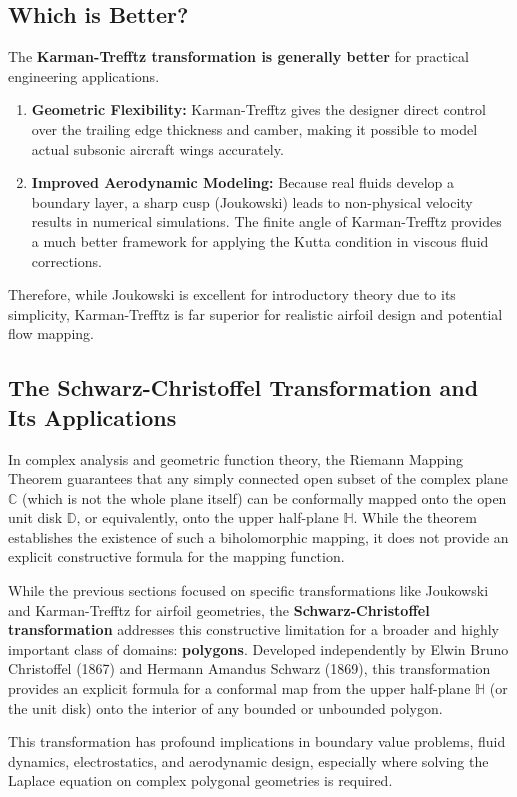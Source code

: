\documentclass[12pt,a4paper]{article}
\begin{document}
\subsection{Which is Better?}
The \textbf{Karman-Trefftz transformation is generally better} for practical engineering applications. 
\begin{enumerate}
    \item \textbf{Geometric Flexibility:} Karman-Trefftz gives the designer direct control over the trailing edge thickness and camber, making it possible to model actual subsonic aircraft wings accurately.
    \item \textbf{Improved Aerodynamic Modeling:} Because real fluids develop a boundary layer, a sharp cusp (Joukowski) leads to non-physical velocity results in numerical simulations. The finite angle of Karman-Trefftz provides a much better framework for applying the Kutta condition in viscous fluid corrections.
\end{enumerate}
Therefore, while Joukowski is excellent for introductory theory due to its simplicity, Karman-Trefftz is far superior for realistic airfoil design and potential flow mapping.
\subsection{The Schwarz-Christoffel Transformation and Its Applications}

In complex analysis and geometric function theory, the Riemann Mapping Theorem guarantees that any simply connected open subset of the complex plane $\mathbb{C}$ (which is not the whole plane itself) can be conformally mapped onto the open unit disk $\mathbb{D}$, or equivalently, onto the upper half-plane $\mathbb{H}$. While the theorem establishes the existence of such a biholomorphic mapping, it does not provide an explicit constructive formula for the mapping function.

While the previous sections focused on specific transformations like Joukowski and Karman-Trefftz for airfoil geometries, the \textbf{Schwarz-Christoffel transformation} addresses this constructive limitation for a broader and highly important class of domains: \textbf{polygons}. Developed independently by Elwin Bruno Christoffel (1867) and Hermann Amandus Schwarz (1869), this transformation provides an explicit formula for a conformal map from the upper half-plane $\mathbb{H}$ (or the unit disk) onto the interior of any bounded or unbounded polygon.

This transformation has profound implications in boundary value problems, fluid dynamics, electrostatics, and aerodynamic design, especially where solving the Laplace equation on complex polygonal geometries is required.
\end{document}
